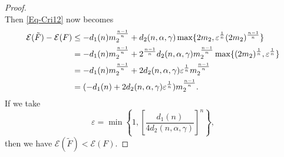 \documentclass[11pt,reqno]{amsart}
\theoremstyle{definition}
\theoremstyle{remark}
\numberwithin{equation}{section}
\renewcommand{\(}{\left(}
\renewcommand{\)}{\right)}
\renewcommand{\widetilde}{\tilde}
\renewcommand{\-}{\overline}
\begin{document}
\begin{proof}
\begin{equation*}
 \end{equation*}
 Then \eqref{Eq-Cri12} now becomes
 \begin{align}
 	\mathcal{E}(\widetilde{F})-\mathcal{E}(F)&\leq -d_1(n)m_2^{\frac{n-1}{n}}+d_2(n,\alpha,\gamma)\max\{2m_2,{\varepsilon}^{\frac{1}{n}}(2m_2)^{\frac{n-1}{n}}\}\notag\\
 	&=-d_1(n)m_2^{\frac{n-1}{n}}+2^{\frac{n-1}{n}}d_2(n,\alpha,\gamma)m_2^{\frac{n-1}{n}}\max\{(2m_2)^{\frac{1}{n}},\varepsilon^{\frac{1}{n}}\}\notag\\
 	&=-d_1(n)m_2^{\frac{n-1}{n}}+2d_2(n,\alpha,\gamma)\varepsilon^{\frac{1}{n}}m_2^{\frac{n-1}{n}}\notag\\
 	&=(-d_1(n)+2d_2(n,\alpha,\gamma)\varepsilon^{\frac{1}{n}})m_2^{\frac{n-1}{n}}.
 \end{align}
If we take 
\begin{equation}\label{Value-e}
	\varepsilon=\min\left\{1,\left[\frac{d_1(n)}{4d_2(n,\alpha,\gamma)}\right]^n\right\},
\end{equation}
then we have $\mathcal{E}(\widetilde{F})<\mathcal{E}(F)$.
\end{proof}
\end{document}
